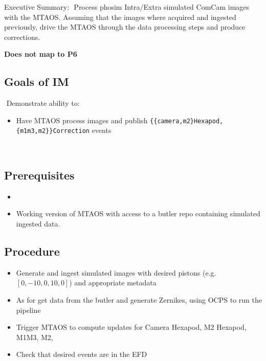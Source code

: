 Executive Summary:
​
Process phosim Intra/Extra simulated ComCam images with the MTAOS.
Assuming that the images where acquired and ingested previously, drive the MTAOS through the data processing steps and produce corrections.

\textbf{Does not map to P6}
​
\subsection{Goals of IM}
​
Demonstrate ability to:
​
\begin{itemize}
\item Have MTAOS process images and publish
  \texttt{\{\{camera,m2\}Hexapod,\{m1m3,m2\}\}Correction} events
\end{itemize}
​
\subsection{Prerequisites}
\begin{itemize}
\item {}
\item Working version of MTAOS with access to a butler repo containing simulated ingested data.
\end{itemize}

\subsection{Procedure}
\begin{itemize}
\item Generate and ingest simulated images with desired pistons (e.g. $[0, -10, 0, 10, 0]$) and appropriate
  metadata
\item As for  get data from the butler and generate Zernikes, using OCPS to run the pipeline
\item Trigger MTAOS to compute updates for Camera Hexapod, M2 Hexapod, M1M3, M2, 
\item Check that desired events are in the EFD
\end{itemize}
